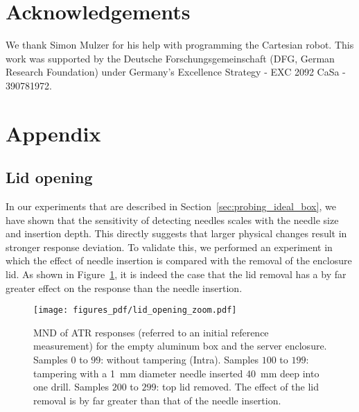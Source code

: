 \documentclass[conference]{IEEEtran}
\begin{document}
\section*{Acknowledgements}
We thank Simon Mulzer for his help with programming the Cartesian robot. This work was supported by the Deutsche Forschungsgemeinschaft (DFG, German Research Foundation) under Germany’s Excellence Strategy - EXC 2092 CaSa - 390781972.
 




















\appendix

\section{Appendix}

\subsection{Lid opening}
In our experiments that are described in Section~\ref{sec:probing_ideal_box}, we have shown that the sensitivity of detecting needles scales with the needle size and insertion depth. This directly suggests that larger physical changes result in stronger response deviation. To validate this, we performed an experiment in which the effect of needle insertion is compared with the removal of the enclosure lid. As shown in Figure~\ref{fig:lidopening}, it is indeed the case that the lid removal has a by far greater effect on the response than the needle insertion.
\begin{figure}[h]
\centering
\texttt{[image: figures\_pdf/lid\_opening\_zoom.pdf]}
\caption{MND of ATR responses (referred to an initial reference measurement) for the empty aluminum box and the server enclosure. Samples $0$ to $99$: without tampering (Intra). Samples $100$ to $199$: tampering with a \SI{1}{\mm} diameter needle inserted \SI{40}{\mm} deep into one drill. Samples $200$ to $299$: top lid removed. The effect of the lid removal is by far greater than that of the needle insertion.} \label{fig:lidopening}
\end{figure}
\FloatBarrier
\end{document}
